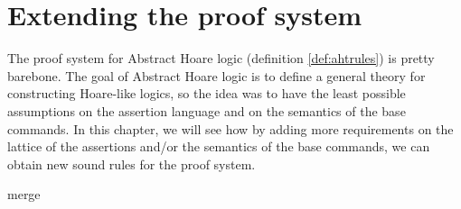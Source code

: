\chapter{Extending the proof system}

The proof system for Abstract Hoare logic (definition \ref{def:ahtrules}) is 
pretty barebone. The goal of Abstract Hoare logic is to define a general 
theory for constructing Hoare-like logics, so the idea was to have the least 
possible assumptions on the assertion language and on the semantics of the base
commands. In this chapter, we will see how by adding more requirements on the 
lattice of the assertions and/or the semantics of the base commands, we can 
obtain new sound rules for the proof system.

{merge}
